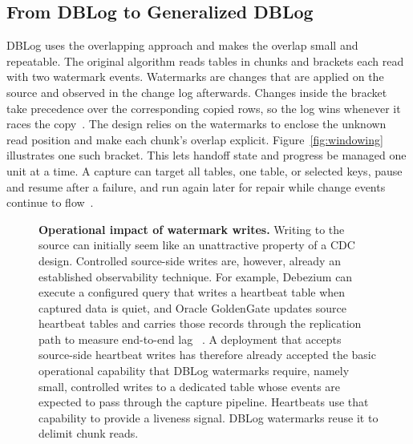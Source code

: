\documentclass[sigconf,nonacm,10pt]{acmart}
\theoremstyle{plain}
\theoremstyle{definition}
\begin{document}
\subsection{From DBLog to Generalized DBLog}

DBLog uses the overlapping approach and makes the overlap small and
repeatable. The original algorithm reads tables in chunks and brackets
each read with two watermark events. Watermarks are changes that are
applied on the source and observed in the change log afterwards. Changes
inside the bracket take
precedence over the corresponding copied rows, so the log wins whenever
it races the copy~\cite{andreakis2020dblog,dblog_netflix_blog}. The design relies on the
watermarks to enclose the unknown read position and make each chunk's
overlap explicit. Figure~\ref{fig:windowing} illustrates one such bracket.
This lets handoff state and progress be managed one
unit at a time. A capture can target all tables, one table, or selected
keys, pause and resume after a failure, and run again later for repair
while change events continue to flow~\cite{andreakis2020dblog}.

\begin{figure}[t]
\begin{mdframed}[
  topline=false,bottomline=false,rightline=false,leftline=true,
  linecolor=black!38,linewidth=1.25pt,
  innerleftmargin=8pt,innerrightmargin=1pt,
  innertopmargin=2pt,innerbottommargin=2pt,
  skipabove=0pt,skipbelow=0pt,nobreak=true]
\small
\RaggedRight
\textbf{Operational impact of watermark writes.}
Writing to the source can initially seem like an unattractive property
of a CDC design. Controlled source-side writes are, however, already an
established observability technique. For example, Debezium can execute a configured
query that writes a heartbeat table when captured data is quiet, and
Oracle GoldenGate updates source heartbeat tables and carries those
records through the replication path to measure end-to-end lag
~\cite{debezium_postgresql_connector,oracle_goldengate_heartbeat}.
A deployment that accepts source-side heartbeat writes has therefore
already accepted the basic operational capability that DBLog
watermarks require, namely small, controlled writes to a dedicated table whose
events are expected to pass through the capture pipeline. Heartbeats use
that capability to provide a liveness signal. DBLog watermarks reuse it
to delimit chunk reads.
\end{mdframed}
\end{figure}
\end{document}
